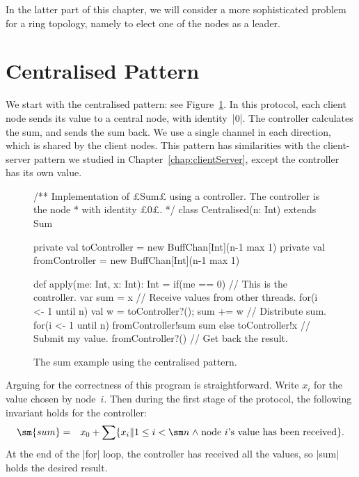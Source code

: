 In the latter part of this chapter, we will consider a more sophisticated
problem for a ring topology, namely to elect one of the nodes as a leader. 


\section{Centralised Pattern}

We start with the centralised pattern: see Figure~\ref{fig:sum-centralised}.
In this protocol, each client node sends its value to a central node, with
identity~|0|.  The controller calculates the sum, and sends the sum back.
We use a single channel in each direction, which is shared by the client
nodes.  This pattern has similarities with the client-server pattern we
studied in Chapter~\ref{chap:clientServer}, except the controller has its own
value. 


\begin{figure}
\begin{scala}
/** Implementation of £Sum£ using a controller.  The controller is the node
  * with identity £0£. */
class Centralised(n: Int) extends Sum{
  private val toController = new BuffChan[Int](n-1 max 1)
  private val fromController = new BuffChan[Int](n-1 max 1)

  def apply(me: Int, x: Int): Int = {
    if(me == 0){ // This is the controller.
      var sum = x
      // Receive values from other threads.
      for(i <- 1 until n){ val w = toController?(); sum += w }
      // Distribute sum.
      for(i <- 1 until n) fromController!sum
      sum
    }
    else{
      toController!x     // Submit my value.
      fromController?() // Get back the result.
    }
  }
}
\end{scala}
\caption{The sum example using the centralised pattern.}
\label{fig:sum-centralised}
\end{figure}


Arguing for the correctness of this program is straightforward.
Write $x_i$ for the value chosen by node~$i$.  Then during the first stage of
the protocol, the following invariant holds for the controller:
%
\begin{eqnarray*}
\sm{sum} & = & 
   x_0 + \sum \set{x_i \| 1 \le i < \sm n \land 
           \mbox{node~$i$'s value has been received}}.
\end{eqnarray*}
%
At the end of the |for| loop, the controller has received all the values, so
|sum| holds the desired result. 

